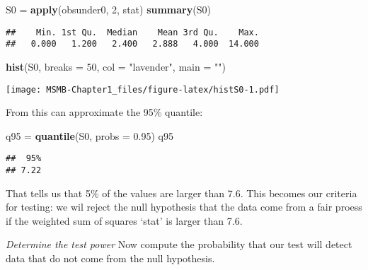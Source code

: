 \documentclass[]{article}
\newenvironment{Shaded}{\begin{snugshade}}{\end{snugshade}}
\newcommand{\KeywordTok}[1]{\textcolor[rgb]{0.13,0.29,0.53}{\textbf{#1}}}
\newcommand{\DataTypeTok}[1]{\textcolor[rgb]{0.13,0.29,0.53}{#1}}
\newcommand{\DecValTok}[1]{\textcolor[rgb]{0.00,0.00,0.81}{#1}}
\newcommand{\FloatTok}[1]{\textcolor[rgb]{0.00,0.00,0.81}{#1}}
\newcommand{\StringTok}[1]{\textcolor[rgb]{0.31,0.60,0.02}{#1}}
\newcommand{\NormalTok}[1]{#1}
\let\origfigure\figure
\let\endorigfigure\endfigure
\renewenvironment{figure}[1][2] {
    \expandafter\origfigure\expandafter[H]
} {
    \endorigfigure
}
\begin{document}
\begin{Shaded}
\begin{Highlighting}[]
\NormalTok{S0 =}\StringTok{ }\KeywordTok{apply}\NormalTok{(obsunder0, }\DecValTok{2}\NormalTok{, stat)}
\KeywordTok{summary}\NormalTok{(S0)}
\end{Highlighting}
\end{Shaded}

\begin{verbatim}
##    Min. 1st Qu.  Median    Mean 3rd Qu.    Max. 
##   0.000   1.200   2.400   2.888   4.000  14.000
\end{verbatim}

\begin{Shaded}
\begin{Highlighting}[]
\KeywordTok{hist}\NormalTok{(S0, }\DataTypeTok{breaks =} \DecValTok{50}\NormalTok{, }\DataTypeTok{col =} \StringTok{"lavender"}\NormalTok{, }\DataTypeTok{main =} \StringTok{""}\NormalTok{)}
\end{Highlighting}
\end{Shaded}

\begin{figure}
\centering
\texttt{[image: MSMB-Chapter1\_files/figure-latex/histS0-1.pdf]}
\caption{The histogram of simulated values \texttt{S0} of the statistic
\texttt{stat} under the null (fair) distribution provides an
approximation of the \textbf{sampling distribution} of the statistic
\texttt{stat}.}
\end{figure}

From this can approximate the 95\% quantile:

\begin{Shaded}
\begin{Highlighting}[]
\NormalTok{q95 =}\StringTok{ }\KeywordTok{quantile}\NormalTok{(S0, }\DataTypeTok{probs =} \FloatTok{0.95}\NormalTok{)}
\NormalTok{q95}
\end{Highlighting}
\end{Shaded}

\begin{verbatim}
##  95% 
## 7.22
\end{verbatim}

That tells us that 5\% of the values are larger than 7.6. This becomes
our criteria for testing: we wil reject the null hypothesis that the
data come from a fair proess if the weighted sum of squares `stat' is
larger than 7.6.

\emph{Determine the test power} Now compute the probability that our
test will detect data that do not come from the null hypothesis.
\end{document}
